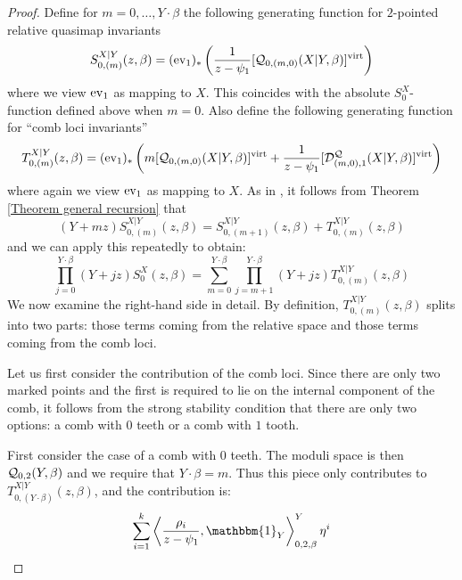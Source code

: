 \begin{proof}
Define for $m = 0, \ldots, Y \cdot \beta$ the following generating function for $2$-pointed relative quasimap invariants
 \[
  S_{0,(m)}^{X|Y}(z,\beta)=(\operatorname{ev}_1)_*\left(\frac{1}{z-\psi_1}[\mathcal{Q}_{0,(m,0)}(X|Y,\beta)]^{\operatorname{virt}}\right)
 \]
where we view $\operatorname{ev}_1$ as mapping to $X$. This coincides with the absolute $S_0^X$-function defined above when $m=0$. Also define the following generating function for ``comb loci invariants''
\[
 T_{0,(m)}^{X|Y}(z,\beta)=(\operatorname{ev}_1)_*\left(m [\mathcal{Q}_{0,(m,0)}(X|Y,\beta)]^{\operatorname{virt}}+\frac{1}{z-\psi_1} [\mathcal{D}^{\mathcal{Q}}_{(m,0),1}(X|Y,\beta)]^{\operatorname{virt}} \right)
\]
where again we view $\operatorname{ev}_1$ as mapping to $X$. As in \cite[Lemma 1.2]{Ga-MF}, it follows from Theorem \ref{Theorem general recursion} that
\begin{equation}
 (Y+mz) S_{0,(m)}^{X|Y}(z,\beta) = S_{0,(m+1)}^{X|Y}(z,\beta)+ T_{0,(m)}^{X|Y}(z,\beta)
\end{equation}
and we can apply this repeatedly to obtain:
\begin{equation} \label{eqn:G}
\prod_{j=0}^{Y\cdot\beta}(Y+jz) S_0^X(z,\beta) = \sum_{m=0}^{Y\cdot\beta}\prod_{j=m+1}^{Y\cdot\beta}(Y+jz)T_{0,(m)}^{X|Y}(z,\beta)
\end{equation}
We now examine the right-hand side in detail. By definition, $T_{0,(m)}^{X|Y}(z,\beta)$ splits into two parts: those terms coming from the relative space and those terms coming from the comb loci.

Let us first consider the contribution of the comb loci. Since there are only two marked points and the first is required to lie on the internal component of the comb, it follows from the strong stability condition that there are only two options: a comb with $0$ teeth or a comb with $1$ tooth.

First consider the case of a comb with $0$ teeth. The moduli space is then $\mathcal{Q}_{0,2}(Y,\beta)$ and we require that $Y \cdot \beta = m$. Thus this piece only contributes to $T_{0,(Y\cdot\beta)}^{X|Y}(z,\beta)$, and the contribution is:
\begin{equation*} \sum_{i=1}^k \left\langle \dfrac{\rho_i}{z-\psi_1}, \mathbbm{1}_Y \right\rangle_{0,2,\beta}^Y \eta^i \end{equation*}


\end{proof}
